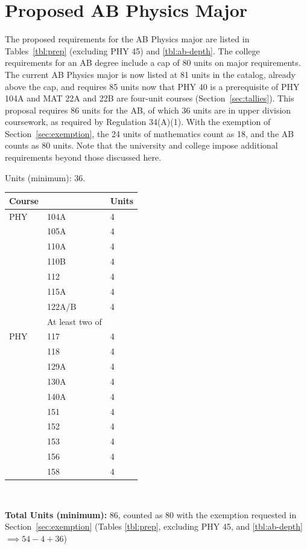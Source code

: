 \documentclass[12pt]{article}
\begin{document}
\newpage
\section{Proposed AB Physics Major}
\label{sec:ab}

The proposed requirements for the AB Physics major are listed in Tables~\ref{tbl:prep} (excluding
PHY 45) and \ref{tbl:ab-depth}.  The college requirements for an AB degree include a cap of 80 units
on major requirements.  The current AB Physics major is now listed at 81 units in the catalog,
already above the cap, and requires 85 units now that PHY 40 is a
prerequisite of PHY 104A and MAT 22A and 22B are four-unit courses (Section~\ref{sec:tallies}).  This proposal requires 86 units for the AB, of which 36 units are in upper
division coursework, as required by Regulation 34(A)(1).  With the exemption of
Section~\ref{sec:exemption}, the 24 units of mathematics count as 18, and the AB counts as 80
units.  Note that the university and college impose additional requirements beyond
those discussed here.

\noindent
\vskip 0.25cm
\begin{center}
Units (minimum):  36.\\
\begin{tabular}{|lll|}
\hline
Course & & Units \\
\hline
PHY & 104A & 4 \\
    & 105A & 4 \\
    & 110A & 4 \\
    & 110B & 4 \\
    & 112  & 4 \\
    & 115A & 4 \\
    & 122A/B & 4 \\
\hline
\hline
    & At least two of & \\ 
\hline
PHY & 117 & 4 \\
    & 118 & 4 \\
    & 129A & 4 \\
    & 130A & 4 \\
    & 140A & 4 \\
    & 151 & 4 \\
    & 152 & 4 \\
    & 153 & 4 \\
    & 156 & 4 \\
    & 158 & 4 \\
\hline
\end{tabular}\\ \vskip 0.25cm
\end{center}
\noindent
{\bf Total Units (minimum):} 86, counted as 80 with the exemption requested in Section~\ref{sec:exemption} (Tables \ref{tbl:prep}, excluding PHY 45, and \ref{tbl:ab-depth} $\implies 54-4+36$)
\end{document}
